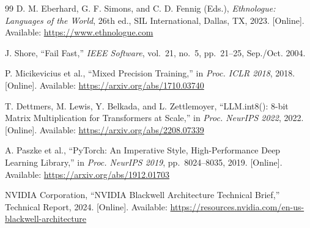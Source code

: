 \documentclass[conference]{IEEEtran}
\begin{document}
\begin{thebibliography}{99}
D. M. Eberhard, G. F. Simons, and C. D. Fennig (Eds.),
\textit{Ethnologue: Languages of the World}, 26th ed.,
SIL International, Dallas, TX, 2023.
[Online]. Available: \url{https://www.ethnologue.com}

J. Shore, ``Fail Fast,''
\textit{IEEE Software}, vol.~21, no.~5, pp.~21--25, Sep./Oct. 2004.

P. Micikevicius et al., ``Mixed Precision Training,''
in \textit{Proc. ICLR 2018}, 2018.
[Online]. Available: \url{https://arxiv.org/abs/1710.03740}

T. Dettmers, M. Lewis, Y. Belkada, and L. Zettlemoyer,
``LLM.int8(): 8-bit Matrix Multiplication for Transformers at Scale,''
in \textit{Proc. NeurIPS 2022}, 2022.
[Online]. Available: \url{https://arxiv.org/abs/2208.07339}

A. Paszke et al., ``PyTorch: An Imperative Style, High-Performance Deep Learning Library,''
in \textit{Proc. NeurIPS 2019}, pp.~8024--8035, 2019.
[Online]. Available: \url{https://arxiv.org/abs/1912.01703}

NVIDIA Corporation, ``NVIDIA Blackwell Architecture Technical Brief,''
Technical Report, 2024.
[Online]. Available: \url{https://resources.nvidia.com/en-us-blackwell-architecture}

\end{thebibliography}
\end{document}
